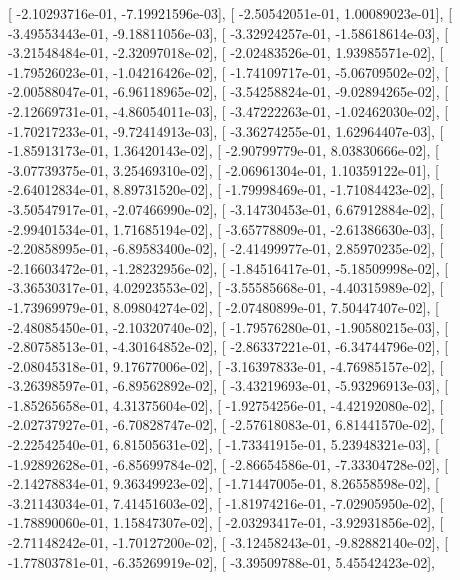 \documentclass{article}
\begin{document}
       [ -2.10293716e-01,  -7.19921596e-03],
       [ -2.50542051e-01,   1.00089023e-01],
       [ -3.49553443e-01,  -9.18811056e-03],
       [ -3.32924257e-01,  -1.58618614e-03],
       [ -3.21548484e-01,  -2.32097018e-02],
       [ -2.02483526e-01,   1.93985571e-02],
       [ -1.79526023e-01,  -1.04216426e-02],
       [ -1.74109717e-01,  -5.06709502e-02],
       [ -2.00588047e-01,  -6.96118965e-02],
       [ -3.54258824e-01,  -9.02894265e-02],
       [ -2.12669731e-01,  -4.86054011e-03],
       [ -3.47222263e-01,  -1.02462030e-02],
       [ -1.70217233e-01,  -9.72414913e-03],
       [ -3.36274255e-01,   1.62964407e-03],
       [ -1.85913173e-01,   1.36420143e-02],
       [ -2.90799779e-01,   8.03830666e-02],
       [ -3.07739375e-01,   3.25469310e-02],
       [ -2.06961304e-01,   1.10359122e-01],
       [ -2.64012834e-01,   8.89731520e-02],
       [ -1.79998469e-01,  -1.71084423e-02],
       [ -3.50547917e-01,  -2.07466990e-02],
       [ -3.14730453e-01,   6.67912884e-02],
       [ -2.99401534e-01,   1.71685194e-02],
       [ -3.65778809e-01,  -2.61386630e-03],
       [ -2.20858995e-01,  -6.89583400e-02],
       [ -2.41499977e-01,   2.85970235e-02],
       [ -2.16603472e-01,  -1.28232956e-02],
       [ -1.84516417e-01,  -5.18509998e-02],
       [ -3.36530317e-01,   4.02923553e-02],
       [ -3.55585668e-01,  -4.40315989e-02],
       [ -1.73969979e-01,   8.09804274e-02],
       [ -2.07480899e-01,   7.50447407e-02],
       [ -2.48085450e-01,  -2.10320740e-02],
       [ -1.79576280e-01,  -1.90580215e-03],
       [ -2.80758513e-01,  -4.30164852e-02],
       [ -2.86337221e-01,  -6.34744796e-02],
       [ -2.08045318e-01,   9.17677006e-02],
       [ -3.16397833e-01,  -4.76985157e-02],
       [ -3.26398597e-01,  -6.89562892e-02],
       [ -3.43219693e-01,  -5.93296913e-03],
       [ -1.85265658e-01,   4.31375604e-02],
       [ -1.92754256e-01,  -4.42192080e-02],
       [ -2.02737927e-01,  -6.70828747e-02],
       [ -2.57618083e-01,   6.81441570e-02],
       [ -2.22542540e-01,   6.81505631e-02],
       [ -1.73341915e-01,   5.23948321e-03],
       [ -1.92892628e-01,  -6.85699784e-02],
       [ -2.86654586e-01,  -7.33304728e-02],
       [ -2.14278834e-01,   9.36349923e-02],
       [ -1.71447005e-01,   8.26558598e-02],
       [ -3.21143034e-01,   7.41451603e-02],
       [ -1.81974216e-01,  -7.02905950e-02],
       [ -1.78890060e-01,   1.15847307e-02],
       [ -2.03293417e-01,  -3.92931856e-02],
       [ -2.71148242e-01,  -1.70127200e-02],
       [ -3.12458243e-01,  -9.82882140e-02],
       [ -1.77803781e-01,  -6.35269919e-02],
       [ -3.39509788e-01,   5.45542423e-02],
\end{document}
